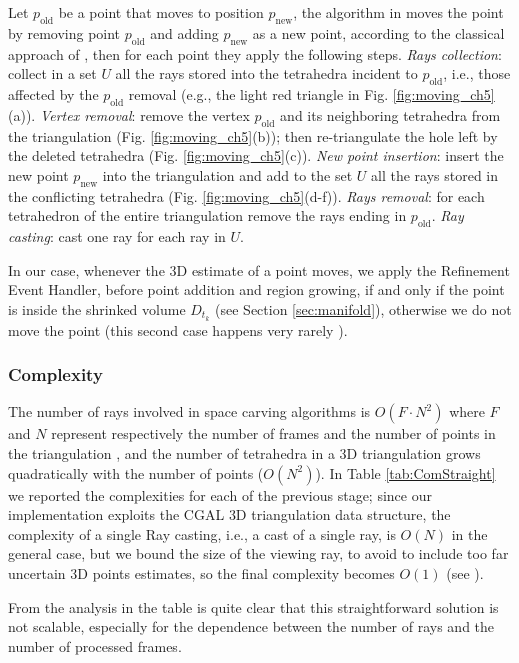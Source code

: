 Let $p_{\text{old}}$ be a point that moves to position $p_{\text{new}}$, the algorithm in \cite{lovi_et_al_11} moves the point by removing point $p_{\text{old}}$ and adding $p_{\text{new}}$ as a new point, according to the classical approach of \cite{Devillers03}, then for each point they apply the following steps. \emph{Rays collection}: collect in a set $U$ all the rays stored into the tetrahedra incident to $p_{\text{old}}$, i.e., those affected by the $p_{\text{old}}$ removal (e.g., the light red triangle in Fig. \ref{fig:moving_ch5}(a)). \emph{Vertex removal}: remove the vertex $p_{\text{old}}$ and its neighboring tetrahedra from the triangulation (Fig. \ref{fig:moving_ch5}(b)); then re-triangulate the hole left by the deleted tetrahedra (Fig. \ref{fig:moving_ch5}(c)). \emph{New point insertion}: insert the new point $p_{\text{new}}$ into the triangulation and add to the set $U$ all the rays stored in the conflicting tetrahedra (Fig. \ref{fig:moving_ch5}(d-f)). \emph{Rays removal}: for each tetrahedron of the entire triangulation remove the rays ending in $p_{\text{old}}$. \emph{Ray casting}: cast one ray for each ray in $U$.

In our case, whenever the 3D estimate of a point moves, we apply the Refinement Event Handler, before point addition and region growing, if and only if the point is inside the shrinked volume $D_{t_k}$ (see Section \ref{sec:manifold}), otherwise we do not move the point (this second case happens very rarely \cite{litvinov_lhuillier_13}).
\subsubsection{Complexity}
The number of rays involved in space carving algorithms is $O(F\cdot N^2)$ where $F$ and $N$ represent respectively the number of frames and the number of points in the triangulation \cite{lovi_et_al_11}, and the number of tetrahedra in a 3D triangulation grows quadratically with the number of points ($O(N^2)$). 
In Table \ref{tab:ComStraight} we reported the complexities for each of the previous stage; since our implementation exploits the CGAL \cite{cgal} 3D triangulation data structure, the complexity of a single Ray casting, i.e., a cast of a single ray, is $O(N)$ in the general case, but we bound the size of the viewing ray, to avoid to include too far uncertain 3D points estimates, so the final complexity becomes $O(1)$  (see \cite[p.94]{yu2013automatic}).

From the analysis in the table is quite clear that this straightforward solution is not scalable, especially for the dependence between the number of rays and the number of processed frames. 

